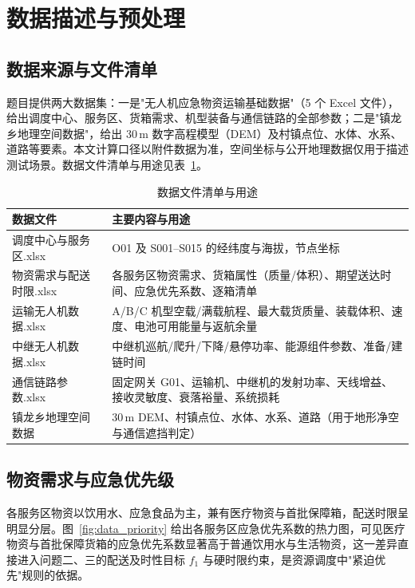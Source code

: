 \section{数据描述与预处理}

\subsection{数据来源与文件清单}

题目提供两大数据集：一是"无人机应急物资运输基础数据"（5 个 Excel 文件），给出调度中心、服务区、货箱需求、机型装备与通信链路的全部参数；二是"镇龙乡地理空间数据"，给出 30\,m 数字高程模型（DEM）及村镇点位、水体、水系、道路等要素。本文计算口径以附件数据为准，空间坐标与公开地理数据仅用于描述测试场景。数据文件清单与用途见表~\ref{tab:data_files}。

\begin{table}[htbp]
\centering
\caption{数据文件清单与用途}
\label{tab:data_files}
\small
\begin{tabular}{ll}
\toprule
\textbf{数据文件} & \textbf{主要内容与用途} \\
\midrule
调度中心与服务区.xlsx & O01 及 S001--S015 的经纬度与海拔，节点坐标 \\
物资需求与配送时限.xlsx & 各服务区物资需求、货箱属性（质量/体积）、期望送达时间、应急优先系数、逐箱清单 \\
运输无人机数据.xlsx & A/B/C 机型空载/满载航程、最大载货质量、装载体积、速度、电池可用能量与返航余量 \\
中继无人机数据.xlsx & 中继机巡航/爬升/下降/悬停功率、能源组件参数、准备/建链时间 \\
通信链路参数.xlsx & 固定网关 G01、运输机、中继机的发射功率、天线增益、接收灵敏度、衰落裕量、系统损耗 \\
镇龙乡地理空间数据 & 30\,m DEM、村镇点位、水体、水系、道路（用于地形净空与通信遮挡判定） \\
\bottomrule
\end{tabular}
\end{table}

\subsection{物资需求与应急优先级}

各服务区物资以饮用水、应急食品为主，兼有医疗物资与首批保障箱，配送时限呈明显分层。图~\ref{fig:data_priority} 给出各服务区应急优先系数的热力图，可见医疗物资与首批保障货箱的应急优先系数显著高于普通饮用水与生活物资，这一差异直接进入问题二、三的配送及时性目标 $f_1$ 与硬时限约束，是资源调度中"紧迫优先"规则的依据。

